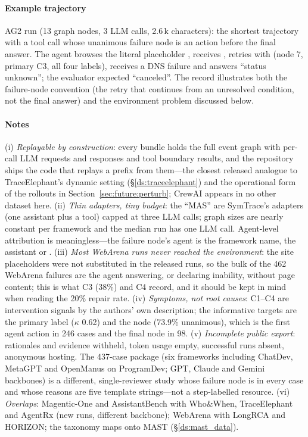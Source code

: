 \paragraph{Example trajectory} AG2 run  (13 graph nodes, 3 LLM calls, 2.6\,k characters): the shortest trajectory with a tool call whose unanimous failure node is an action before the final answer. The agent browses the literal placeholder , receives , retries with  (node 7, primary C3, all four labels), receives a DNS failure and answers ``status unknown''; the evaluator expected ``canceled''. The record illustrates both the failure-node convention (the retry that continues from an unresolved condition, not the final answer) and the environment problem discussed below.


\paragraph{Notes} (i) \emph{Replayable by construction}: every bundle holds the full event graph with per-call LLM requests and responses and tool boundary results, and the repository ships the code that replays a prefix from them---the closest released analogue to TraceElephant's dynamic setting (\S\ref{ds:traceelephant}) and the operational form of the rollouts in Section~\ref{sec:future:perturb}; CrewAI appears in no other dataset here. (ii) \emph{Thin adapters, tiny budget}: the ``MAS'' are SymTrace's  adapters (one assistant plus a  tool) capped at three LLM calls; graph sizes are nearly constant per framework and the median run has one LLM call. Agent-level attribution is meaningless---the failure node's agent is the framework name, the assistant or . (iii) \emph{Most WebArena runs never reached the environment}: the site placeholders were not substituted in the released runs, so the bulk of the 462 WebArena failures are the agent answering, or declaring inability, without page content; this is what C3 (38\%) and C4 record, and it should be kept in mind when reading the 20\% repair rate. (iv) \emph{Symptoms, not root causes}: C1--C4 are intervention signals by the authors' own description; the informative targets are the primary label ($\kappa$ 0.62) and the node (73.9\% unanimous), which is the first agent action in 246 cases and the final node in 98. (v) \emph{Incomplete public export}: rationales and evidence withheld, token usage empty, successful runs absent, anonymous hosting. The 437-case package (six frameworks including ChatDev, MetaGPT and OpenManus on ProgramDev; GPT, Claude and Gemini backbones) is a different, single-reviewer study whose failure node is  in every case and whose reasons are five template strings---not a step-labelled resource. (vi) \emph{Overlaps}: Magentic-One and AssistantBench with Who\&When, TraceElephant and AgentRx (new runs, different backbone); WebArena with LongRCA and HORIZON; the taxonomy maps onto MAST (\S\ref{ds:mast_data}).
